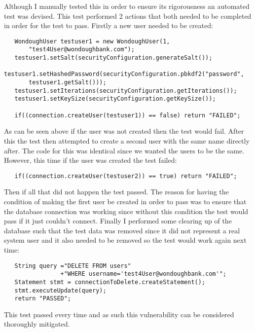 Although I manually tested this in order to ensure its rigorousness an automated test was devised. This test performed 2 actions that both needed to be completed in order for
the test to pass. Firstly a new user needed to be created:
\begin{verbatim}
   WondoughUser testuser1 = new WondoughUser(1,
       "test4User@wondoughbank.com");
   testuser1.setSalt(securityConfiguration.generateSalt());
   testuser1.setHashedPassword(securityConfiguration.pbkdf2("password",
       testuser1.getSalt()));
   testuser1.setIterations(securityConfiguration.getIterations());
   testuser1.setKeySize(securityConfiguration.getKeySize());
 
   if((connection.createUser(testuser1)) == false) return "FAILED";
\end{verbatim}
As can be seen above if the user was not created then the test would fail. After this the test then attempted to create a second user with the same name directly after. The code
for this was identical since we wanted the users to be the same. However, this time if the user was created the test failed:
\begin{verbatim}
   if((connection.createUser(testuser2)) == true) return "FAILED";
\end{verbatim}
Then if all that did not happen the test passed. The reason for having the condition of making the first user be created in order to pass was to ensure that the database
connection was working since without this condition the test would pass if it just couldn't connect. Finally I performed some clearing up of the database such that the test data
was removed since it did not represent a real system user and it also needed to be removed so the test would work again next time:
\begin{verbatim}
   String query ="DELETE FROM users"
                +"WHERE username='test4User@wondoughbank.com'";
   Statement stmt = connectionToDelete.createStatement();
   stmt.executeUpdate(query);
   return "PASSED";
\end{verbatim}
This test passed every time and as such this vulnerability can be considered thoroughly mitigated.
